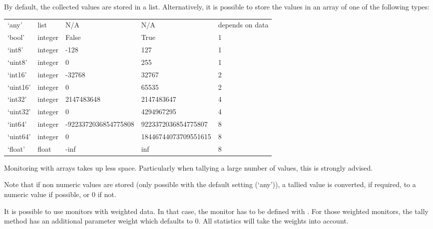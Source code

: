 \documentclass[letterpaper,10pt,english]{sphinxmanual}
\begin{document}
By default, the collected values are stored in a list. Alternatively, it is possible to store
the values in an array of one of the following types:


\begin{savenotes}\sphinxattablestart
\centering
\begin{tabulary}{\linewidth}[t]{|T|T|T|T|T|}
\hline
{}\relax &\relax &\relax &\relax &\relax \\
\hline
‘any’
&
list
&
N/A
&
N/A
&
depends on data
\\
\hline
‘bool’
&
integer
&
False
&
True
&
1
\\
\hline
‘int8’
&
integer
&
-128
&
127
&
1
\\
\hline
‘uint8’
&
integer
&
0
&
255
&
1
\\
\hline
‘int16’
&
integer
&
-32768
&
32767
&
2
\\
\hline
‘uint16’
&
integer
&
0
&
65535
&
2
\\
\hline
‘int32’
&
integer
&
2147483648
&
2147483647
&
4
\\
\hline
‘uint32’
&
integer
&
0
&
4294967295
&
4
\\
\hline
‘int64’
&
integer
&
-9223372036854775808
&
9223372036854775807
&
8
\\
\hline
‘uint64’
&
integer
&
0
&
18446744073709551615
&
8
\\
\hline
‘float’
&
float
&
-inf
&
inf
&
8
\\
\hline
\end{tabulary}
\par
\sphinxattableend\end{savenotes}

Monitoring with arrays takes up less space. Particularly when tallying a large
number of values, this is strongly advised.

Note that if non numeric values are stored (only possible with the default setting (‘any’)),
a tallied value is converted, if required, to a numeric value if possible, or 0 if not.

It is possible to use monitors with weighted data. In that case, the monitor has to be defined
with .
For those weighted monitors, the tally method has an additional parameter weight which defaults to 0.
All statistics will take the weights into account.
\end{document}
